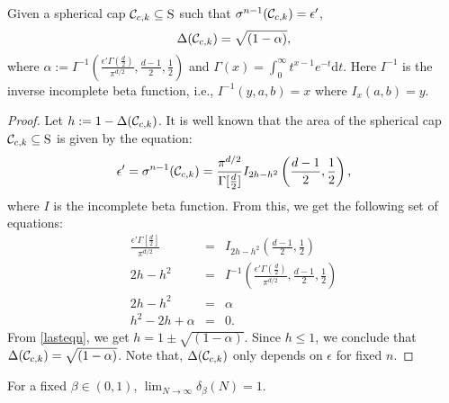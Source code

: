 \begin{theorem}Given a spherical cap $\mathcal{C}_{c,k} \subseteq \text{S}$ such that $\sigma^{n-1}(\mathcal{C}_{c,k}) = \epsilon'$, 
\begin{equation*}\Delta(\mathcal{C}_{c,k}) = \sqrt{(1-\alpha)}, \end{equation*}
where $\alpha := I^{-1}\left(\frac{\epsilon'\Gamma(\frac{d}{2})}{\pi^{d/2}}, \frac{d-1}{2}, \frac{1}{2}\right)$ and $\Gamma(x)=\int_{0}^{\infty} t^{x-1} e^{-t} \text{d}t$. Here $I^{-1}$ is the inverse incomplete beta function, i.e.,  $I^{-1}(y, a,b)= x$ where $I_x(a,b)=y$.
\end{theorem}

\begin{proof}Let $h:=1-\Delta(\mathcal{C}_{c,k})$. It is well known \cite{sphericalCapRef} that the area of the spherical cap $\mathcal{C}_{c,k} \subseteq \text{S}$ is given by the equation:
\begin{equation}\epsilon' = \sigma^{n-1}(\mathcal{C}_{c,k}) = \frac{\pi^{d/2}}{\Gamma[\frac{d}{2}]}I_{2h-h^2} \left(\frac{d-1}{2}, \frac{1}{2}\right),
\end{equation}
where $I$ is the incomplete beta function. 
From this, we get the following set of equations:
\begin{eqnarray}\nonumber \frac{\epsilon' \Gamma[\frac{d}{2}]}{\pi^{d/2}} &=& I_{2h-h^2}\left(\frac{d-1}{2}, \frac{1}{2}\right) \\
\nonumber 2h-h^2 &=&  I^{-1}\left(\frac{\epsilon'\Gamma(\frac{d}{2})}{\pi^{d/2}}, \frac{d-1}{2}, \frac{1}{2}\right) \\
\nonumber 2h-h^2 & = & \alpha \\
\label{lasteqn}h^2 -2h +\alpha &=& 0.
\end{eqnarray}
From \eqref{lasteqn}, we get $h=1\pm \sqrt{(1-\alpha)}$. Since $h\leq1$, we conclude that \mbox{$\Delta(\mathcal{C}_{c,k}) = \sqrt{(1-\alpha)}$.} Note that, $\Delta(\mathcal{C}_{c,k})$ only depends on $\epsilon$ for fixed $n$.
\end{proof}

\begin{corollary}For a fixed $\beta \in (0,1)$, $\lim_{N \to \infty} \delta_\beta(N) = 1$.
\end{corollary}

